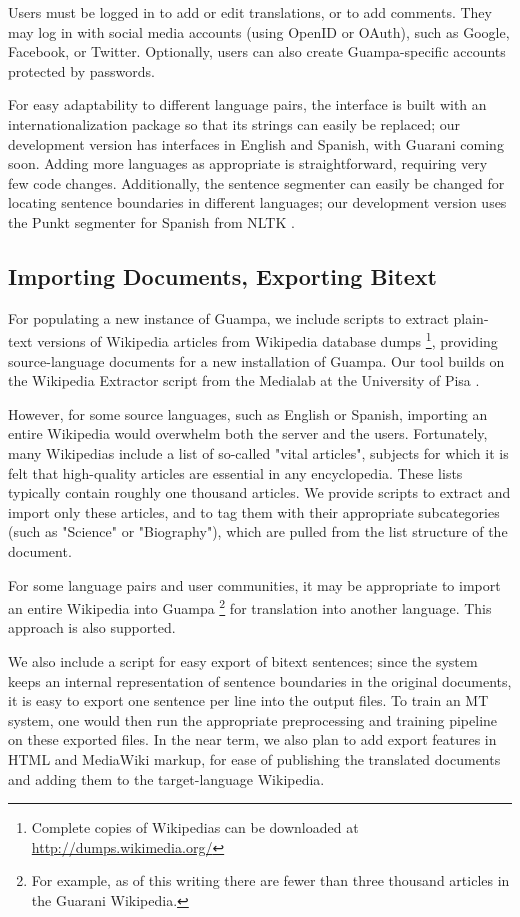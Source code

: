 \documentclass[10pt, a4paper]{article}
\begin{document}
Users must be logged in to add or edit translations, or to add comments. They
may log in with social media accounts (using OpenID or OAuth), such as Google,
Facebook, or Twitter. Optionally, users can also create Guampa-specific
accounts protected by passwords.

For easy adaptability to different language pairs, the interface is built with
an internationalization package so that its strings can easily be replaced; our
development version has interfaces in English and Spanish, with Guarani coming
soon. Adding more languages as appropriate is straightforward, requiring very
few code changes. Additionally, the sentence segmenter can easily be changed
for locating sentence boundaries in different languages; our development
version uses the Punkt segmenter for Spanish from NLTK \cite{nltkbook}.


\subsection{Importing Documents, Exporting Bitext}
For populating a new instance of Guampa, we include scripts to extract
plain-text versions of Wikipedia articles from Wikipedia database dumps
\footnote{Complete copies of Wikipedias can be downloaded at \\
\url{http://dumps.wikimedia.org/}}, providing source-language documents for a
new installation of Guampa. Our tool builds on the Wikipedia Extractor
script from the Medialab at the University of Pisa \cite{pisa-wp-extractor}.

However, for some source languages, such as English or Spanish, importing an
entire Wikipedia would overwhelm both the server and the users. Fortunately,
many Wikipedias include a list of so-called "vital articles", subjects for
which it is felt that high-quality articles are essential in any encyclopedia.
These lists typically contain roughly one thousand articles. We provide scripts
to extract and import only these articles, and to tag them with their
appropriate subcategories (such as "Science" or "Biography"), which are pulled
from the list structure of the document.

For some language pairs and user communities, it may be appropriate to import
an entire Wikipedia into Guampa \footnote{For example, as of this writing there are fewer than three thousand articles in the Guarani Wikipedia.} for
translation into another language. This approach is also supported.

We also include a script for easy export of bitext sentences; since the system
keeps an internal representation of sentence boundaries in the original
documents, it is easy to export one sentence per line into the output files. To
train an MT system, one would then run the appropriate preprocessing and
training pipeline on these exported files. In the near term, we also plan to
add export features in HTML and MediaWiki markup, for ease of publishing the
translated documents and adding them to the target-language Wikipedia.
\end{document}
